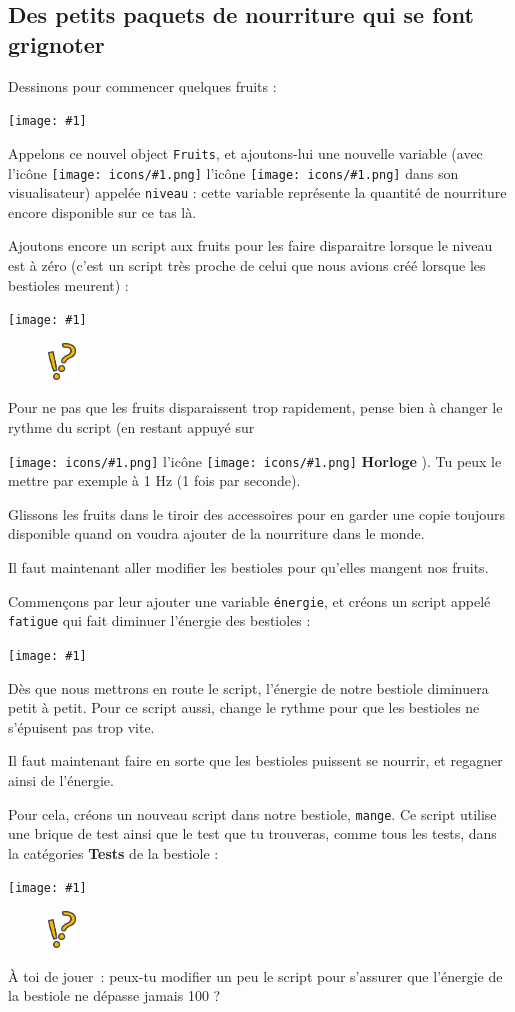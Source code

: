 \documentclass[a4paper,12pt]{book}
\newcommand{\capture}[1]
{
\begin{center}
	\texttt{[image: \#1]}
\end{center}
}
\newcommand{\brique}[1]{
\sffamily
\fcolorbox[RGB]{200,192,144}{200,248,200}{\textbf{#1}}
\normalfont
}
\newcommand{\code}[1]{\texttt{#1}}
\newcommand{\important}[1]{\textbf{#1}}
\newcommand{\inserticon}[1]
{
\texttt{[image: icons/\#1.png]}
}
\newcommand{\icon}[2][]
{
\ifthenelse {\equal{#1} {}} {\inserticon{#2}} {l'icône \inserticon{#2} \important{#1}}
}
\newcommand{\astuce}[1]
{
\begin{framed}
\begin{figure}
	\vspace{-15pt}
	\includegraphics[width=2.0em]{astuce.png}
\end{figure}
#1
\end{framed}
}
\let\myMargin\marginpar
\renewcommand{\marginpar}[1]{\myMargin{{\scriptsize \sffamily #1}}}
\begin{document}
\subsection{Des petits paquets de nourriture qui se font grignoter}

Dessinons pour commencer quelques fruits :

\capture{53.png}

Appelons ce nouvel object \code{Fruits}, et ajoutons-lui une nouvelle variable
(avec l'icône \icon{variable} dans son visualisateur) appelée \code{niveau} :
cette variable représente la quantité de nourriture encore disponible sur ce
tas là.

Ajoutons encore un script aux fruits pour les faire disparaitre lorsque le
niveau est à zéro (c'est un script très proche de celui que nous avions créé
lorsque les bestioles meurent) :

\capture{54.png}

\astuce{Pour ne pas que les fruits disparaissent trop rapidement, pense bien à
changer le rythme du script (en restant appuyé sur
\icon[Horloge]{horlogestop}). Tu peux le mettre par exemple à 1 Hz (1 fois par
seconde).}

Glissons les fruits dans le tiroir des accessoires pour en garder une copie
toujours disponible quand on voudra ajouter de la nourriture dans le monde.

Il faut maintenant aller modifier les bestioles pour qu'elles mangent nos
fruits.

Commençons par leur ajouter une variable \code{énergie}, et créons un script
appelé \code{fatigue} qui fait diminuer l'énergie des bestioles :

\capture{55.png}

Dès que nous mettrons en route le script, l'énergie de notre bestiole diminuera
petit à petit. Pour ce script aussi, change le rythme pour que les bestioles ne
s'épuisent pas trop vite.

Il faut maintenant faire en sorte que les bestioles puissent se nourrir, et
regagner ainsi de l'énergie.

Pour cela, créons un nouveau script dans notre bestiole, \code{mange}. Ce
script utilise une brique de test ainsi que le test \brique{touche un} que tu trouveras, comme tous les tests, dans la catégories \important{Tests} de la bestiole :

\capture{56.png}

\astuce{À toi de jouer~: peux-tu modifier un peu le script pour s'assurer que
l'énergie de la bestiole ne dépasse jamais 100 ?}
\end{document}
